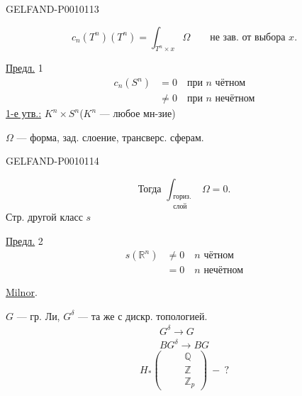 \begin{GelfandAdjacentEvidence}{GELFAND-P001011}{3}

\[
c_n(T^n)(T^n)=\int_{T^n\times x}\Omega
\qquad\text{не зав. от выбора }x.
\]

\underline{Предл.} 1
\[
\begin{aligned}
c_n(S^n)&=0\quad\text{при }n\text{ чётном}\\
&\ne0\quad\text{при }n\text{ нечётном}
\end{aligned}
\]
\underline{1-е утв.:}
$K^n\times S^n$\qquad ($K^n$ --- любое мн-зие)

$\Omega$ --- форма, зад. слоение, трансверс. сферам.
\end{GelfandAdjacentEvidence}
\begin{GelfandAdjacentEvidence}{GELFAND-P001011}{4}

\[
\text{Тогда }\int_{\substack{\text{гориз.}\\\text{слой}}}\Omega=0.
\]
Стр. другой класс $s$

\underline{Предл.} 2
\[
\begin{aligned}
s(\mathbb R^n)&\ne0\quad n\text{ чётном}\\
&=0\quad n\text{ нечётном}
\end{aligned}
\]

\underline{\underline{Milnor}}.

$G$ --- гр. Ли, $G^\delta$ --- та же с дискр. топологией.
\[
\begin{gathered}
G^\delta\longrightarrow G\\
BG^\delta\longrightarrow BG
\end{gathered}
\]
\[
H_*\left(\qquad\begin{matrix}\mathbb Q\\\mathbb Z\\\mathbb Z_p\end{matrix}\right)\ -\ ?
\]
\end{GelfandAdjacentEvidence}


